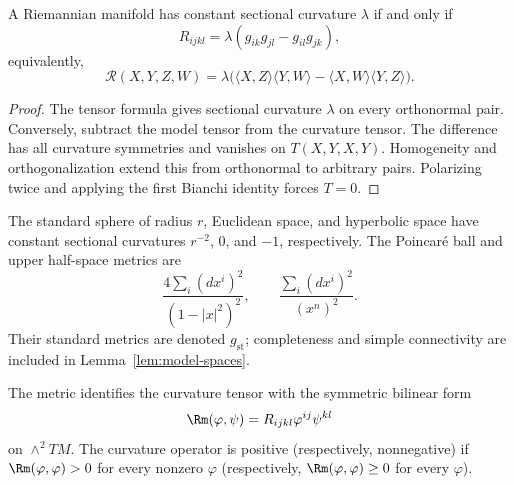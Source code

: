 \begin{lemma}
\label{lem:constant-curvature-tensor}
\leanok



A Riemannian manifold has constant sectional curvature $\lambda$ if
and only if
\[
  R_{ijkl}=\lambda(g_{ik}g_{jl}-g_{il}g_{jk}),
\]
equivalently,
\[
  \mathcal R(X,Y,Z,W)=\lambda\bigl(
  \langle X,Z\rangle\langle Y,W\rangle
  -\langle X,W\rangle\langle Y,Z\rangle\bigr).
\]
\end{lemma}

\begin{proof}
\sketch
{}
\leanok
The tensor formula gives sectional curvature $\lambda$ on every
orthonormal pair. Conversely, subtract the model tensor from the
curvature tensor. The difference has all curvature symmetries and
vanishes on $T(X,Y,X,Y)$. Homogeneity and orthogonalization extend this
from orthonormal to arbitrary pairs. Polarizing twice and applying the
first Bianchi identity forces $T=0$.
\end{proof}

The standard sphere of radius $r$, Euclidean space, and hyperbolic space
have constant sectional curvatures $r^{-2}$, $0$, and $-1$,
respectively. The Poincar\'e ball and upper half-space metrics are
\[
  \frac{4\sum_i(dx^i)^2}{(1-|x|^2)^2},
  \qquad
  \frac{\sum_i(dx^i)^2}{(x^n)^2}.
\]
Their standard metrics are denoted $g_{\mathrm{st}}$; completeness and
simple connectivity are included in Lemma~\ref{lem:model-spaces}.


\begin{definition}
\label{def:curvature-operator}
\leanok



The metric identifies the curvature tensor with the symmetric bilinear
form
\[
  \Rm(\varphi,\psi)=R_{ijkl}\varphi^{ij}\psi^{kl}
\]
on $\wedge^2TM$. The curvature operator is positive (respectively,
nonnegative) if $\Rm(\varphi,\varphi)>0$ for every nonzero $\varphi$
(respectively, $\Rm(\varphi,\varphi)\ge0$ for every $\varphi$).
\end{definition}

